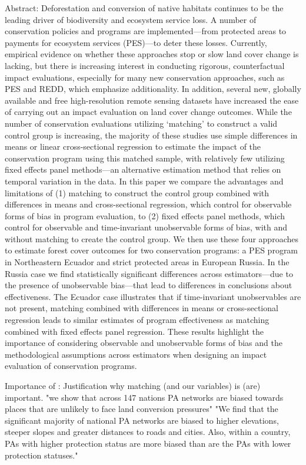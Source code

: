 \documentclass{article}
\begin{document}
Abstract: Deforestation and conversion of native habitats continues to be the leading driver of biodiversity and ecosystem service loss. A number of conservation policies and programs are implemented—from protected areas to payments for ecosystem services (PES)—to deter these losses. Currently, empirical evidence on whether these approaches stop or slow land cover change is lacking, but there is increasing interest in conducting rigorous, counterfactual impact evaluations, especially for many new conservation approaches, such as PES and REDD, which emphasize additionality. In addition, several new, globally available and free high-resolution remote sensing datasets have increased the ease of carrying out an impact evaluation on land cover change outcomes. While the number of conservation evaluations utilizing ‘matching’ to construct a valid control group is increasing, the majority of these studies use simple differences in means or linear cross-sectional regression to estimate the impact of the conservation program using this matched sample, with relatively few utilizing fixed effects panel methods—an alternative estimation method that relies on temporal variation in the data. In this paper we compare the advantages and limitations of (1) matching to construct the control group combined with differences in means and cross-sectional regression, which control for observable forms of bias in program evaluation, to (2) fixed effects panel methods, which control for observable and time-invariant unobservable forms of bias, with and without matching to create the control group. We then use these four approaches to estimate forest cover outcomes for two conservation programs: a PES program in Northeastern Ecuador and strict protected areas in European Russia. In the Russia case we find statistically significant differences across estimators—due to the presence of unobservable bias—that lead to differences in conclusions about effectiveness. The Ecuador case illustrates that if time-invariant unobservables are not present, matching combined with differences in means or cross-sectional regression leads to similar estimates of program effectiveness as matching combined with fixed effects panel regression. These results highlight the importance of considering observable and unobservable forms of bias and the methodological assumptions across estimators when designing an impact evaluation of conservation programs.

Importance of \citep{joppa2009high}: Justification why matching (and our variables) is (are) important. "we show that across 147 nations PA networks are biased towards places that are unlikely to face land conversion pressures" "We find that the significant majority of national PA networks are biased to higher elevations, steeper slopes and greater distances to roads and cities. Also, within a country, PAs with higher protection status are more biased than are the PAs with lower protection statuses."
\end{document}
